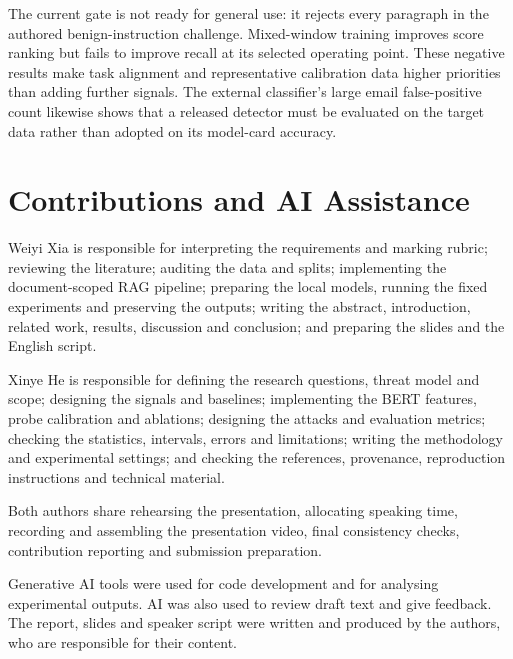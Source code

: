 \documentclass[conference,a4paper]{IEEEtran}
\begin{document}
The current gate is not ready for general use: it rejects every paragraph in the authored benign-instruction challenge. Mixed-window training improves score ranking but fails to improve recall at its selected operating point. These negative results make task alignment and representative calibration data higher priorities than adding further signals. The external classifier's large email false-positive count likewise shows that a released detector must be evaluated on the target data rather than adopted on its model-card accuracy.

\section*{Contributions and AI Assistance}
Weiyi Xia is responsible for interpreting the requirements and marking rubric; reviewing the literature; auditing the data and splits; implementing the document-scoped RAG pipeline; preparing the local models, running the fixed experiments and preserving the outputs; writing the abstract, introduction, related work, results, discussion and conclusion; and preparing the slides and the English script.

Xinye He is responsible for defining the research questions, threat model and scope; designing the signals and baselines; implementing the BERT features, probe calibration and ablations; designing the attacks and evaluation metrics; checking the statistics, intervals, errors and limitations; writing the methodology and experimental settings; and checking the references, provenance, reproduction instructions and technical material.

Both authors share rehearsing the presentation, allocating speaking time, recording and assembling the presentation video, final consistency checks, contribution reporting and submission preparation.

Generative AI tools were used for code development and for analysing experimental outputs. AI was also used to review draft text and give feedback. The report, slides and speaker script were written and produced by the authors, who are responsible for their content.
\end{document}
